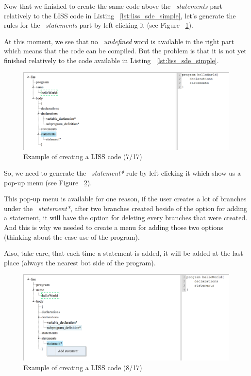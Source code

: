 \documentclass[
  oneside,
  11pt, a4paper,
  footinclude=true,
  headinclude=true,
  cleardoublepage=empty
]{scrbook}
\begin{document}
Now that we finished to create the same code above the ~\textit{statements} part relatively to the LISS code in Listing ~\ref{lst:liss_sde_simple}, let's generate the rules for the ~\textit{statements} part by left clicking it (see Figure ~\ref{fig:LISS-SDE_example_7}).

At this moment, we see that no ~\textit{undefined} word is available in the right part which means that the code can be compiled. But the problem is that it is not yet finished relatively to the code available in Listing ~\ref{lst:liss_sde_simple}.

\begin{figure}[h!]
  \centering
    \includegraphics[width=1\textwidth]{img/LISS-SDE_creating_program/LISS-SDE7.png}
    \caption{Example of creating a LISS code (7/17)}
    \label{fig:LISS-SDE_example_7}
\end{figure}

So, we need to generate the ~\textit{statement*} rule by left clicking it which show us a pop-up menu (see Figure ~\ref{fig:LISS-SDE_example_8}).

This pop-up menu is available for one reason, if the user creates a lot of branches under the ~\textit{statement*}, after two branches created beside of the option for adding a statement, it will have the option for deleting every branches that were created. And this is why we needed to create a menu for adding those two options (thinking about the ease use of the program).

Also, take care, that each time a statement is added, it will be added at the last place (always the nearest bot side of the program).

\begin{figure}[h!]
  \centering
    \includegraphics[width=1\textwidth]{img/LISS-SDE_creating_program/LISS-SDE8.png}
    \caption{Example of creating a LISS code (8/17)}
    \label{fig:LISS-SDE_example_8}
\end{figure}
\end{document}
